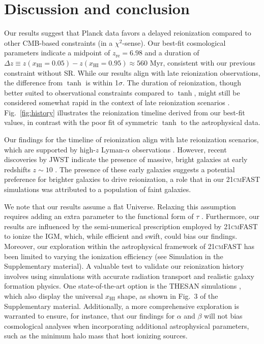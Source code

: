 \documentclass[12pt]{article}
\newcommand{\HI}{\mathrm{HI}}
\newcommand{\re}{\mathrm{re}}
\newcommand{\ap}{\alpha}
\newcommand{\tilt}{\beta}
\begin{document}
\section{Discussion and conclusion}
Our results suggest that Planck data favors a delayed reionization
compared to other CMB-based constraints (in a $\chi^2$-sense).
Our best-fit cosmological parameters indicate a midpoint of $z_\re =
6.98$ and a duration of $\Delta z \equiv z(x_\HI = 0.05) - z(x_\HI =
0.95) \approx 560 $ Myr, consistent with our previous constraint
without SR.
While our results align with late reionization observations, the
difference from $\tanh$ is within 1$\sigma$.
The duration of reionization, though better suited to observational
constraints compared to $\tanh$, might still be considered somewhat
rapid in the context of late reionization scenarios \cite{Cain2021}.
Fig.~\ref{fig:history} illustrates the reionization timeline derived from
our best-fit values, in contrast with the poor fit of symmetric $\tanh$
to the astrophysical data.

Our findings for the timeline of reionization align with late
reionization scenarios, which are supported by high-$z$ Lyman-$\alpha$
observations \cite{Keating2020, Cain2021}.
However, recent discoveries by JWST indicate the presence of massive,
bright galaxies at early redshifts $z \sim 10$ \cite{Adams2023,
Bradley2023, Donnan2023}.
The presence of these early galaxies suggests a potential preference for
brighter galaxies to drive reionization, a role that in our
\textsc{21cmFAST} simulations was attributed to a population of faint
galaxies.

We note that our results assume a flat Universe.
Relaxing this assumption requires adding an extra parameter to the
functional form of $\tau$ \cite{Anselmi2023}.
Furthermore, our results are influenced by the semi-numerical
prescription employed by \textsc{21cmFAST} to ionize the IGM, which,
while efficient and swift, could bias our findings.
Moreover, our exploration within the astrophysical framework of
\textsc{21cmFAST} has been limited to varying the ionization efficiency
(see Simulation in the Supplementary material).
A valuable test to validate our reionization history involves using
simulations with accurate radiation transport and realistic galaxy
formation physics.
One state-of-the-art option is the THESAN simulations \cite{Kannan2022},
which also display the universal $x_\HI$ shape, as shown in
Fig.~3 of the Supplementary material.
Additionally, a more comprehensive exploration is warranted to ensure,
for instance, that our findings for $\ap$ and $\tilt$ will not bias
cosmological analyses when incorporating additional astrophysical
parameters, such as the minimum halo mass that host ionizing sources.
\end{document}
